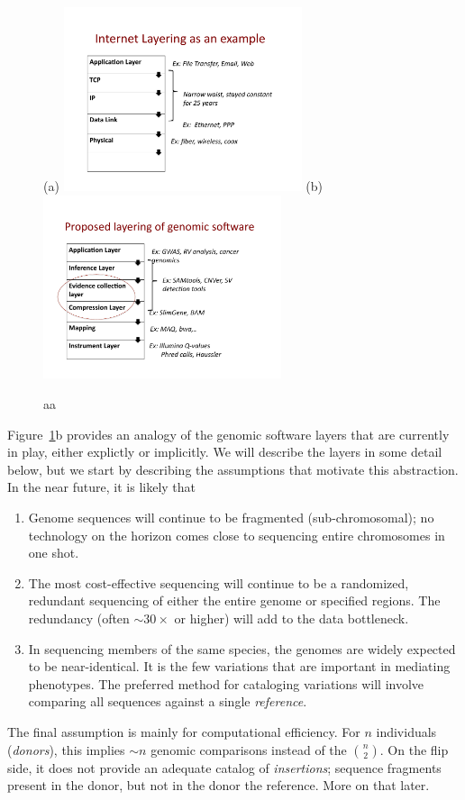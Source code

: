 \documentclass[11pt]{article}
\begin{document}
\begin{figure}[h]
  \centering
(a)  \includegraphics[width=2.75in]{fig/TCPlayer.pdf}
(b)  \includegraphics[width=2.75in]{fig/genomiclayer.pdf}
  \caption{aa}
  \label{fig:layer}
\end{figure}

Figure~\ref{fig:layer}b provides an analogy of the genomic software
layers that are currently in play, either explictly or implicitly. We
will describe the layers in some detail below, but we start by
describing the assumptions that motivate this abstraction. In the near
future, it is likely that
\begin{enumerate}
\item Genome sequences will continue to be fragmented
  (sub-chromosomal); no technology on the horizon comes close to
  sequencing entire chromosomes in one shot.
\item The most cost-effective sequencing will continue to be a
  randomized, redundant sequencing of either the entire genome or
  specified regions. The redundancy (often $\sim 30\times$ or higher)
  will add to the data bottleneck.
\item In sequencing members of the same species, the genomes are
  widely expected to be near-identical. It is the few variations that
  are important in mediating phenotypes. The preferred method for
  cataloging variations will involve comparing all sequences against a
  single \emph{reference}.
\end{enumerate}
The final assumption is mainly for computational efficiency. For $n$
individuals (\emph{donors}), this implies $\sim n$ genomic comparisons instead of the
${n\choose 2}$. On the flip side, it does not provide an adequate
catalog of \emph{insertions}; sequence fragments present in the donor,
but not in the donor the reference. More on that later.
\end{document}
